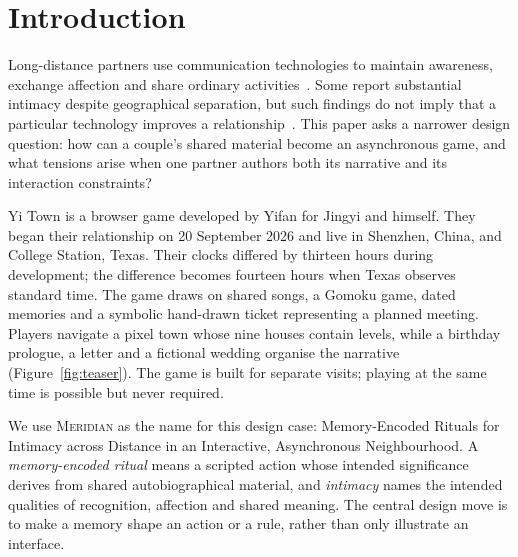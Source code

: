 \documentclass[sigconf,nonacm]{acmart}
\newcommand{\yt}{Yi Town}
\begin{document}

\section{Introduction}
Long-distance partners use communication technologies to maintain awareness, exchange affection
and share ordinary activities~\cite{vetere2005mediating,lottridge2009sharing,neustaedter2012intimacy}.
Some report substantial intimacy despite geographical separation, but such findings do not imply
that a particular technology improves a relationship~\cite{jiang2013absence,stafford2005maintaining}.
This paper asks a narrower design question: how can a couple's shared material become an
asynchronous game, and what tensions arise when one partner authors both its narrative and its
interaction constraints?

\yt{} is a browser game developed by Yifan for Jingyi and himself. They began their relationship
on 20 September 2026 and live in Shenzhen, China, and College Station, Texas. Their clocks differed
by thirteen hours during development; the difference becomes fourteen hours when Texas observes
standard time. The game draws on shared songs, a Gomoku game, dated memories and a symbolic
hand-drawn ticket representing a planned meeting. Players navigate a pixel town whose nine houses
contain levels, while a birthday prologue, a letter and a fictional wedding organise the narrative
(Figure~\ref{fig:teaser}). The game is built for separate visits; playing at the same time is
possible but never required.

We use \textsc{Meridian} as the name for this design case: Memory-Encoded Rituals for Intimacy
across Distance in an Interactive, Asynchronous Neighbourhood. A \emph{memory-encoded ritual}
means a scripted action whose intended significance derives from shared autobiographical material,
and \emph{intimacy} names the intended qualities of recognition, affection and shared meaning.
The central design move is to make a memory shape an action or a rule, rather than only illustrate
an interface.
\end{document}
